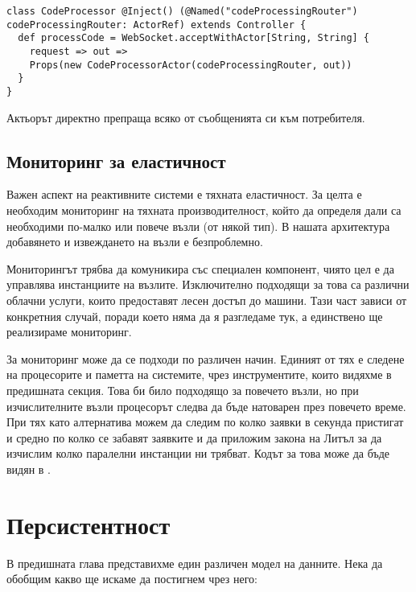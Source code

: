 \begin{lstlisting}
class CodeProcessor @Inject() (@Named("codeProcessingRouter") codeProcessingRouter: ActorRef) extends Controller {
  def processCode = WebSocket.acceptWithActor[String, String] {
    request => out =>
    Props(new CodeProcessorActor(codeProcessingRouter, out))
  }
}
\end{lstlisting}

Актьорът директно препраща всяко от съобщенията си към потребителя.

\subsection{Мониторинг за еластичност}

Важен аспект на реактивните системи е тяхната еластичност. За целта е необходим мониторинг на тяхната производителност, който да определя дали са необходими по-малко или повече възли (от някой тип). В нашата архитектура добавянето и извеждането на възли е безпроблемно.

Мониторингът трябва да комуникира със специален компонент, чиято цел е да управлява инстанциите на възлите. Изключително подходящи за това са различни облачни услуги, които предоставят лесен достъп до машини. Тази част зависи от конкретния случай, поради което няма да я разгледаме тук, а единствено ще реализираме мониторинг.

За мониторинг може да се подходи по различен начин. Единият от тях е следене на процесорите и паметта на системите, чрез инструментите, които видяхме в предишната секция. Това би било подходящо за повечето възли, но при изчислителните възли процесорът следва да бъде натоварен през повечето време. При тях като алтернатива можем да следим по колко заявки в секунда пристигат и средно по колко се забавят заявките и да приложим закона на Литъл за да изчислим колко паралелни инстанции ни трябват. Кодът за това може да бъде видян в .

\section{Персистентност}

В предишната глава представихме един различен модел на данните. Нека да обобщим какво ще искаме да постигнем чрез него:

